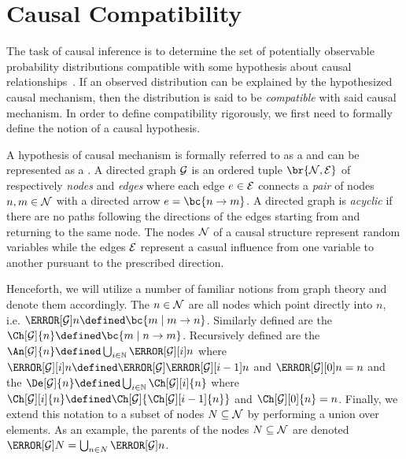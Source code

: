 \documentclass[aps, 10pt, english, twoside, pra, nofootinbib, tightenlines, longbibliography, superscriptaddress]{revtex4-1}
\begin{document}
    \section{Causal Compatibility}
    \label{sec:causal_compatibility}
    The task of causal inference is to determine the set of potentially observable probability distributions compatible with some hypothesis about causal relationships~\cite{Pearl_2009}. If an observed distribution can be explained by the hypothesized causal mechanism, then the distribution is said to be \textit{compatible} with said causal mechanism. In order to define compatibility rigorously, we first need to formally define the notion of a causal hypothesis.

    A hypothesis of causal mechanism is formally referred to as a  and can be represented as a . A directed graph $\mathcal{G}$ is an ordered tuple $\br{\nodes, \edges}$ of respectively \textit{nodes} and \textit{edges} where each edge $e \in \mathcal{E}$ connects a \textit{pair} of nodes $n, m \in \mathcal{N}$ with a directed arrow $e = \bc{n \to m}$. A directed graph is \textit{acyclic} if there are no paths following the directions of the edges starting from and returning to the same node. The nodes $\mathcal{N}$ of a causal structure represent random variables while the edges $\mathcal{E}$ represent a casual influence from one variable to another pursuant to the prescribed direction.

    Henceforth, we will utilize a number of familiar notions from graph theory and denote them accordingly. The  $n \in \mathcal{N}$ are all nodes which point directly into $n$, i.e. $\Pa[\graph]{n} \defined \bc{m \mid m \to n}$. Similarly defined are the  $\Ch[\graph]{n} \defined \bc{m \mid n \to m}$. Recursively defined are the  $\An[\graph]{n} \defined \bigcup_{i\in\mathbb{N}} \Pa[\graph][i]{n}$ where $\Pa[\graph][i]{n} \defined \Pa[\graph]{\Pa[\graph][i-1]{n}}$ and $\Pa[\graph][0]{n} = n$ and the  $\De[\graph]{n} \defined \bigcup_{i\in\mathbb{N}} \Ch[\graph][i]{n}$ where $\Ch[\graph][i]{n} \defined \Ch[\graph]{\Ch[\graph][i-1]{n}}$ and $\Ch[\graph][0]{n} = n$. Finally, we extend this notation to a subset of nodes $N \subseteq \mathcal{N}$ by performing a union over elements. As an example, the parents of the nodes $N \subseteq \mathcal{N}$ are denoted $\Pa[\graph]{N} = \bigcup_{n \in N} \Pa[\graph]{n}$.

\end{document}
